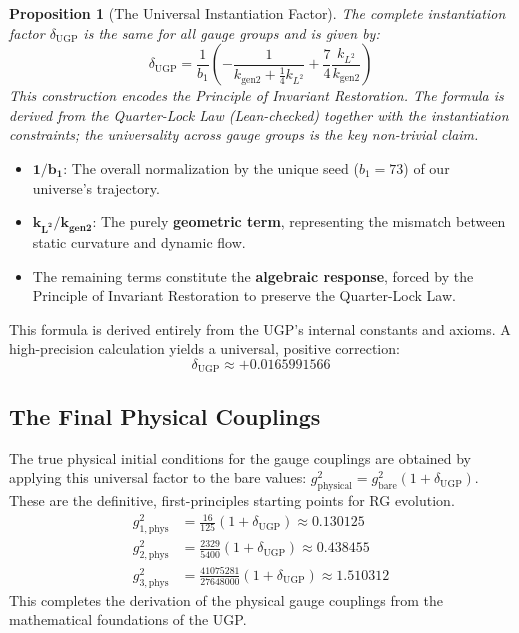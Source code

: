 \documentclass[11pt,twocolumn]{article}
\newtheorem{proposition}{Proposition}[section]
\begin{document}
\begin{proposition}[The Universal Instantiation Factor]
\label{prop:delta_ugp}
The complete instantiation factor $\delta_{\text{UGP}}$ is the same for all gauge groups and is given by:
\begin{equation}
    \delta_{\text{UGP}} = \frac{1}{b_1} \left( -\frac{1}{k_{\text{gen2}} + \frac{1}{4}k_{L^2}} + \frac{7}{4}\frac{k_{L^2}}{k_{\text{gen2}}} \right)
\end{equation}
This construction encodes the Principle of Invariant Restoration. The formula is derived from the Quarter-Lock Law (Lean-checked) together with the instantiation constraints; the universality across gauge groups is the key non-trivial claim.
\end{proposition}

\begin{tcolorbox}[colback=blue!5,colframe=blue!75!black,title=\textbf{Components of the Instantiation Factor}]
\begin{itemize}[leftmargin=1.2em,itemsep=0.2em]
    \item $\mathbf{1/b_1}$: The overall normalization by the unique seed ($b_1=73$) of our universe's trajectory.
    \item $\mathbf{k_{L^2}/k_{\text{gen2}}}$: The purely \textbf{geometric term}, representing the mismatch between static curvature and dynamic flow.
    \item The remaining terms constitute the \textbf{algebraic response}, forced by the Principle of Invariant Restoration to preserve the Quarter-Lock Law.
\end{itemize}
\end{tcolorbox}

This formula is derived entirely from the UGP's internal constants and axioms. A high-precision calculation yields a universal, positive correction:
\[
\delta_{\text{UGP}} \approx +0.0165991566
\]

\subsection{The Final Physical Couplings}
The true physical initial conditions for the gauge couplings are obtained by applying this universal factor to the bare values: $g^2_{\text{physical}} = g^2_{\text{bare}}(1 + \delta_{\text{UGP}})$. These are the definitive, first-principles starting points for RG evolution.
\begin{align}
    g_{1, \text{phys}}^2 &= \frac{16}{125} (1 + \delta_{\text{UGP}}) \approx 0.130125 \\
    g_{2, \text{phys}}^2 &= \frac{2329}{5400} (1 + \delta_{\text{UGP}}) \approx 0.438455 \\
    g_{3, \text{phys}}^2 &= \frac{41075281}{27648000} (1 + \delta_{\text{UGP}}) \approx 1.510312
\end{align}
This completes the derivation of the physical gauge couplings from the mathematical foundations of the UGP.
\end{document}
